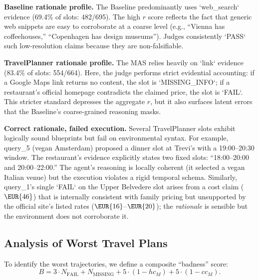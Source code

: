 \documentclass[a4paper,oneside,bibliography=totoc]{scrbook}
\begin{document}
\textbf{Baseline rationale profile.} The Baseline predominantly uses `web_search` evidence (69.4\% of slots: 482/695). The high $r$ score reflects the fact that generic web snippets are easy to corroborate at a coarse level (e.g., ``Vienna has coffeehouses,'' ``Copenhagen has design museums''). Judges consistently `PASS` such low-resolution claims because they are non-falsifiable.

\textbf{TravelPlanner rationale profile.} The MAS relies heavily on `link` evidence (83.4\% of slots: 554/664). Here, the judge performs strict evidential accounting: if a Google Maps link returns no content, the slot is `MISSING\_INFO`; if a restaurant's official homepage contradicts the claimed price, the slot is `FAIL`. This stricter standard depresses the aggregate $r$, but it also surfaces latent errors that the Baseline's coarse-grained reasoning masks.

\textbf{Correct rationale, failed execution.} Several TravelPlanner slots exhibit logically sound blueprints but fail on environmental syntax. For example, query\_5 (vegan Amsterdam) proposed a dinner slot at Trevi's with a 19:00--20:30 window. The restaurant's evidence explicitly states two fixed slots: ``18:00--20:00 and 20:00--22:00.'' The agent's reasoning is locally coherent (it selected a vegan Italian venue) but the execution violates a rigid temporal schema. Similarly, query\_1's single `FAIL` on the Upper Belvedere slot arises from a cost claim ($\EUR{46}$) that is internally consistent with family pricing but unsupported by the official site's listed rates ($\EUR{16}$--$\EUR{20}$); the 
\emph{rationale} is sensible but the environment does not corroborate it.

\subsection{Analysis of Worst Travel Plans}
\label{subsec:worst}

To identify the worst trajectories, we define a composite ``badness'' score:
$$
B = 3 \cdot N_{\text{FAIL}} + N_{\text{MISSING}} + 5 \cdot (1 - hc_M) + 5 \cdot (1 - cc_M).
$$
\end{document}
